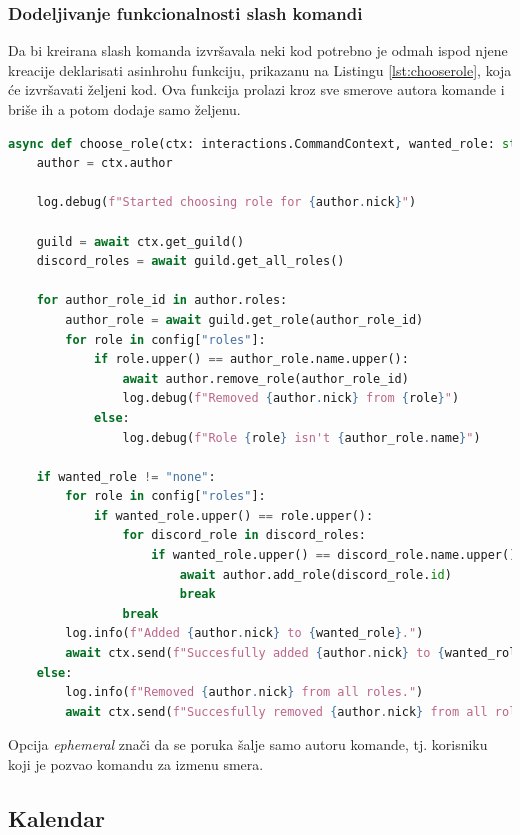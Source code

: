 \documentclass[a4paper,11pt]{article}
\begin{document}
\subsubsection{Dodeljivanje funkcionalnosti slash komandi}
Da bi kreirana slash komanda izvršavala neki kod potrebno je odmah ispod njene kreacije deklarisati asinhrohu funkciju, prikazanu na Listingu \ref{lst:chooserole}, koja će izvršavati željeni kod. Ova funkcija prolazi kroz sve smerove autora komande i briše ih a potom dodaje samo željenu.
\begin{lstlisting}[language=Python, caption=Dodeljivanje funkcionalnosti slash komandi, label=lst:chooserole]
async def choose_role(ctx: interactions.CommandContext, wanted_role: str):
    author = ctx.author

    log.debug(f"Started choosing role for {author.nick}")

    guild = await ctx.get_guild()
    discord_roles = await guild.get_all_roles()

    for author_role_id in author.roles:
        author_role = await guild.get_role(author_role_id)
        for role in config["roles"]:
            if role.upper() == author_role.name.upper():
                await author.remove_role(author_role_id)
                log.debug(f"Removed {author.nick} from {role}")
            else:
                log.debug(f"Role {role} isn't {author_role.name}")
    
    if wanted_role != "none":
        for role in config["roles"]:
            if wanted_role.upper() == role.upper():
                for discord_role in discord_roles:
                    if wanted_role.upper() == discord_role.name.upper():
                        await author.add_role(discord_role.id)
                        break
                break
        log.info(f"Added {author.nick} to {wanted_role}.")
        await ctx.send(f"Succesfully added {author.nick} to {wanted_role.upper()}!", ephemeral=True)
    else:
        log.info(f"Removed {author.nick} from all roles.")
        await ctx.send(f"Succesfully removed {author.nick} from all roles!", ephemeral=True)
\end{lstlisting}
Opcija \textit{ephemeral} znači da se poruka šalje samo autoru komande, tj. korisniku koji je pozvao komandu za izmenu smera.
\newpage
\subsection{Kalendar}
\end{document}

